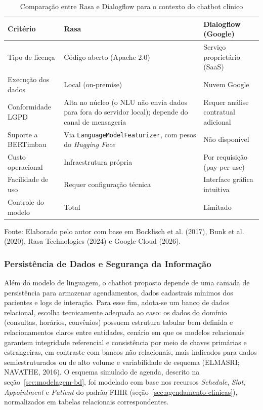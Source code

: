 \documentclass[12pt,a4paper]{extarticle}
\begin{document}
\begin{table}[H]
\centering
\caption{Comparação entre Rasa e Dialogflow para o contexto do chatbot clínico}
\label{tab:rasa-dialogflow}
\begin{tabular}{p{3.8cm}p{5.0cm}p{5.0cm}}
\hline
\textbf{Critério} & \textbf{Rasa} & \textbf{Dialogflow (Google)} \\
\hline
Tipo de licença & Código aberto (Apache 2.0) & Serviço proprietário (SaaS) \\
Execução dos dados & Local (on-premise) & Nuvem Google \\
Conformidade LGPD & Alta no núcleo (o NLU não envia dados para fora do servidor local); depende do canal de mensageria & Requer análise contratual adicional \\
Suporte a BERTimbau & Via \texttt{LanguageModel\allowbreak{}Featurizer}, com pesos do \textit{Hugging Face} & Não disponível \\
Custo operacional & Infraestrutura própria & Por requisição (pay-per-use) \\
Facilidade de uso & Requer configuração técnica & Interface gráfica intuitiva \\
Controle do modelo & Total & Limitado \\
\hline
\end{tabular}
\vspace{0.3cm}

\footnotesize{Fonte: Elaborado pelo autor com base em Bocklisch et al. (2017), Bunk et al. (2020), Rasa Technologies (2024) e Google Cloud (2026).}
\end{table}

\subsubsection{Persistência de Dados e Segurança da Informação}
\label{sec:persistencia}

Além do modelo de linguagem, o chatbot proposto depende de uma camada de persistência para armazenar agendamentos, dados cadastrais mínimos dos pacientes e logs de interação. Para esse fim, adota-se um banco de dados relacional, escolha tecnicamente adequada ao caso: os dados do domínio (consultas, horários, convênios) possuem estrutura tabular bem definida e relacionamentos claros entre entidades, cenário em que os modelos relacionais garantem integridade referencial e consistência por meio de chaves primárias e estrangeiras, em contraste com bancos não relacionais, mais indicados para dados semiestruturados ou de alto volume e variabilidade de esquema (ELMASRI; NAVATHE, 2016). O esquema simulado de agenda, descrito na seção~\ref{sec:modelagem-bd}, foi modelado com base nos recursos \textit{Schedule}, \textit{Slot}, \textit{Appointment} e \textit{Patient} do padrão FHIR (seção~\ref{sec:agendamento-clinicas}), normalizados em tabelas relacionais correspondentes.
\end{document}
